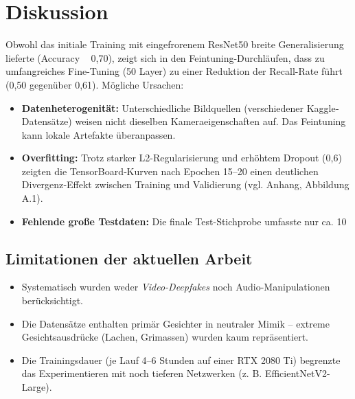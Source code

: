 \chapter{Diskussion}
\label{chap:diskussion}

Obwohl das initiale Training mit eingefrorenem ResNet50 breite Generalisierung lieferte (Accuracy ~ 0,70), zeigt sich in den Feintuning-Durchläufen, dass zu umfangreiches Fine-Tuning (50 Layer) zu einer Reduktion der Recall-Rate führt (0,50 gegenüber 0,61). Mögliche Ursachen:
\begin{itemize}
  \item \textbf{Datenheterogenität:} Unterschiedliche Bildquellen (verschiedener Kaggle‐Datensätze) weisen nicht dieselben Kameraeigenschaften auf. Das Feintuning kann lokale Artefakte überanpassen.  
  \item \textbf{Overfitting:} Trotz starker L2-Regularisierung und erhöhtem Dropout (0,6) zeigten die TensorBoard‐Kurven nach Epochen 15–20 einen deutlichen Divergenz‐Effekt zwischen Training und Validierung (vgl. Anhang, Abbildung A.1).  
  \item \textbf{Fehlende große Testdaten:} Die finale Test-Stichprobe umfasste nur ca. 10 %
\end{itemize}

\section{Limitationen der aktuellen Arbeit}
\begin{itemize}
  \item Systematisch wurden weder \emph{Video-Deepfakes} noch Audio-Manipulationen berücksichtigt.  
  \item Die Datensätze enthalten primär Gesichter in neutraler Mimik – extreme Gesichtsausdrücke (Lachen, Grimassen) wurden kaum repräsentiert.  
  \item Die Trainingsdauer (je Lauf 4–6 Stunden auf einer RTX 2080 Ti) begrenzte das Experimentieren mit noch tieferen Netzwerken (z. B. EfficientNetV2-Large).  
\end{itemize}
